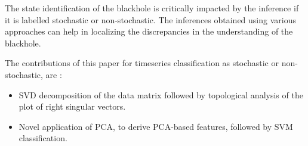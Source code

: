 \documentclass[journal]{IEEEtran}
\begin{document}
	The state identification of the blackhole is critically impacted by the inference if it is labelled stochastic or non-stochastic. The inferences obtained using various approaches can help in localizing the discrepancies in the understanding of the blackhole. 
%	

	 The contributions of this paper for timeseries classification as stochastic or non-stochastic, are :
	\begin{itemize}
		\item SVD decomposition of the data matrix followed by topological analysis of the plot of right singular vectors. 
		
		\item Novel application of PCA, to derive PCA-based features, followed by SVM classification. 
	\end{itemize}
	
\end{document}
